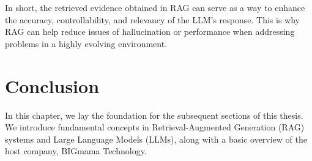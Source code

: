In short, the retrieved evidence obtained in RAG can serve as a way to enhance the accuracy, controllability, and relevancy of the LLM's response. This is why RAG can help reduce issues of hallucination or performance when addressing problems in a highly evolving environment.

\section{Conclusion}

In this chapter, we lay the foundation for the subsequent sections of this thesis. We introduce fundamental concepts in Retrieval-Augmented Generation (RAG) systems and Large Language Models (LLMs), along with a basic overview of the host company, BIGmama Technology.